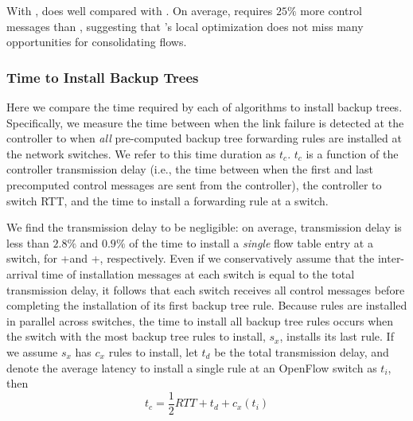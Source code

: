 With \posts, \merge does well compared with \lbs. 
On average, \merge requires $25\%$ more control messages than \lbs, suggesting that \merges's local optimization does not miss many opportunities for consolidating flows.

\subsubsection{Time to Install Backup Trees}
\label{subsubsec:eval-install-time}

Here we compare the time required by each of algorithms to install backup trees.  %
Specifically, we measure the time between when the link failure is detected at the controller to when \emph{all} pre-computed backup tree forwarding rules are installed at the network switches.
We refer to this time duration as $t_c$. 
$t_c$  is a function of the controller transmission delay 
(i.e., the time between when the first and last precomputed control messages are sent from the controller), the controller to switch RTT, and the time to install a forwarding rule at a switch.  

We find the transmission delay to be negligible: on average, transmission delay is less than $2.8\%$ and $0.9\%$ of the time to install a \emph{single} flow table entry at a switch,
for \posts+\base and \posts+\merges, respectively.  Even if we conservatively assume that the inter-arrival time of installation messages at each switch is equal to the total transmission delay,
it follows that each switch receives all control messages before completing the installation of its first backup tree rule.  Because rules are installed in parallel across switches, 
the time to install all backup tree rules occurs when the switch with the most backup tree rules to install, $s_x$, installs its last rule.  If we assume $s_x$ has $c_x$ rules to install, let $t_d$ 
be the total transmission delay, and denote the average latency to install a single rule at an OpenFlow switch as $t_i$, then 
     $$t_c = \frac{1}{2}RTT + t_d + c_x(t_i)$$
	 
